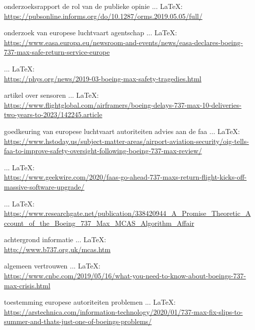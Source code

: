 \begin{thebibliography}{99}
{{{{{{{{							onderzoeksrapport
							de rol van de publieke opinie
							 ... \LaTeX:\\ \url{https://pubsonline.informs.org/do/10.1287/orms.2019.05.05/full/}
							
							onderzoek van europese luchtvaart agentschap
							 ... \LaTeX:\\ \url{https://www.easa.europa.eu/newsroom-and-events/news/easa-declares-boeing-737-max-safe-return-service-europe}
							
							\veiligheidsvraagstuk
							 ... \LaTeX:\\ \url{https://phys.org/news/2019-03-boeing-max-safety-tragedies.html}
							
							artikel over sensoren
							 ... \LaTeX:\\ \url{https://www.flightglobal.com/airframers/boeing-delays-737-max-10-deliveries-two-years-to-2023/142245.article}
							
							goedkeuring van europese luchtvaart autoriteiten
							advies aan de faa
							 ... \LaTeX:\\ \url{https://www.hstoday.us/subject-matter-areas/airport-aviation-security/oig-tells-faa-to-improve-safety-oversight-following-boeing-737-max-review/}
							
							 ... \LaTeX:\\ \url{https://www.geekwire.com/2020/faas-go-ahead-737-maxs-return-flight-kicks-off-massive-software-upgrade/}
							
							 ... \LaTeX:\\ \url{https://www.researchgate.net/publication/338420944_A_Promise_Theoretic_Account_of_the_Boeing_737_Max_MCAS_Algorithm_Affair}
							
							achtergrond informatie
							 ... \LaTeX:\\ \url{http://www.b737.org.uk/mcas.htm}
							
							algemeen vertrouwen
							 ... \LaTeX:\\ \url{https://www.cnbc.com/2019/05/16/what-you-need-to-know-about-boeings-737-max-crisis.html}
							
							toestemming europese autoriteiten
							problemen
							 ... \LaTeX:\\ \url{https://arstechnica.com/information-technology/2020/01/737-max-fix-slips-to-summer-and-thats-just-one-of-boeings-problems/}
							
}}}}}}}}
\end{thebibliography}
